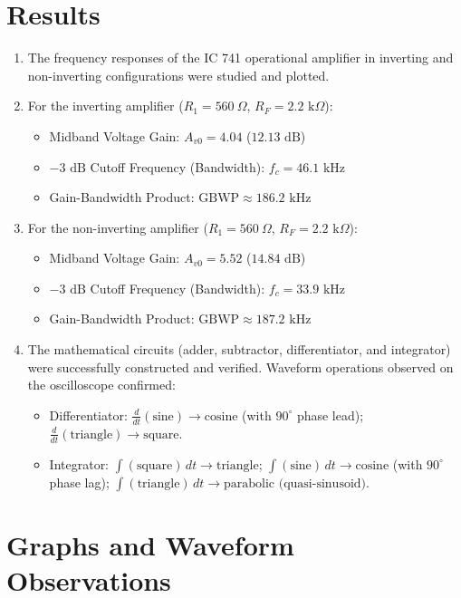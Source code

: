 \documentclass[12pt,a4paper]{article}
\begin{document}
\section{Results}
\begin{enumerate}
    \item The frequency responses of the IC 741 operational amplifier in inverting and non-inverting configurations were studied and plotted.
    \item For the inverting amplifier ($R_1 = 560\ \Omega$, $R_F = 2.2\text{ k}\Omega$):
    \begin{itemize}
        \item Midband Voltage Gain: $A_{v0} = 4.04$ ($12.13\text{ dB}$)
        \item $-3\text{ dB}$ Cutoff Frequency (Bandwidth): $f_c = 46.1\text{ kHz}$
        \item Gain-Bandwidth Product: $\text{GBWP} \approx 186.2\text{ kHz}$
    \end{itemize}
    \item For the non-inverting amplifier ($R_1 = 560\ \Omega$, $R_F = 2.2\text{ k}\Omega$):
    \begin{itemize}
        \item Midband Voltage Gain: $A_{v0} = 5.52$ ($14.84\text{ dB}$)
        \item $-3\text{ dB}$ Cutoff Frequency (Bandwidth): $f_c = 33.9\text{ kHz}$
        \item Gain-Bandwidth Product: $\text{GBWP} \approx 187.2\text{ kHz}$
    \end{itemize}
    \item The mathematical circuits (adder, subtractor, differentiator, and integrator) were successfully constructed and verified. Waveform operations observed on the oscilloscope confirmed:
    \begin{itemize}
        \item Differentiator: $\frac{d}{dt}(\text{sine}) \to \text{cosine}$ (with $90^\circ$ phase lead); $\frac{d}{dt}(\text{triangle}) \to \text{square}$.
        \item Integrator: $\int (\text{square})\,dt \to \text{triangle}$; $\int (\text{sine})\,dt \to \text{cosine}$ (with $90^\circ$ phase lag); $\int (\text{triangle})\,dt \to \text{parabolic (quasi-sinusoid)}$.
    \end{itemize}
\end{enumerate}

\section{Graphs and Waveform Observations}
\end{document}
